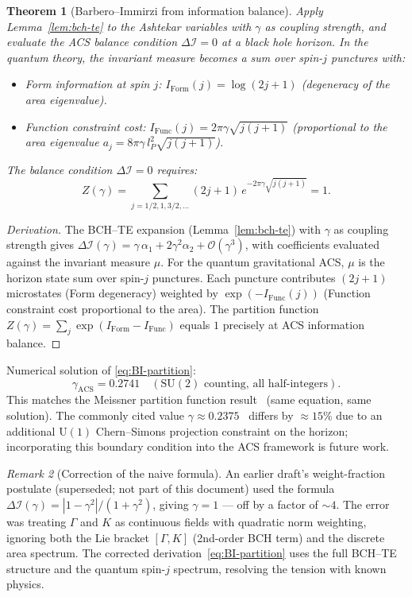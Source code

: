 \documentclass[12pt,a4paper]{article}
\theoremstyle{plain}
\newtheorem{theorem}{Theorem}[section]
\theoremstyle{definition}
\theoremstyle{remark}
\newtheorem{remark}[theorem]{Remark}
\newcommand{\DI}{\Delta\mathcal{I}}
\newcommand{\Order}[1]{\mathcal{O}(#1)}
\begin{document}
\begin{theorem}[Barbero--Immirzi from information balance]\label{thm:BI}
Apply Lemma~\ref{lem:bch-te} to the Ashtekar variables with $\gamma$
as coupling strength, and evaluate the ACS balance condition $\DI = 0$
at a black hole horizon.  In the quantum theory, the invariant measure
becomes a sum over spin-$j$ punctures with:
\begin{itemize}[noitemsep]
  \item Form information at spin $j$: $I_{\mathrm{Form}}(j) = \log(2j+1)$
    (degeneracy of the area eigenvalue).
  \item Function constraint cost: $I_{\mathrm{Func}}(j) = 2\pi\gamma\sqrt{j(j+1)}$
    (proportional to the area eigenvalue $a_j = 8\pi\gamma\,l_P^2\sqrt{j(j+1)}$).
\end{itemize}
The balance condition $\DI = 0$ requires:
\begin{equation}\label{eq:BI-partition}
  Z(\gamma) = \sum_{j=1/2,1,3/2,\ldots} (2j+1)\,
  e^{-2\pi\gamma\sqrt{j(j+1)}} = 1.
\end{equation}
\end{theorem}

\begin{proof}[Derivation]
The BCH--TE expansion (Lemma~\ref{lem:bch-te}) with $\gamma$ as
coupling strength gives $\DI(\gamma) = \gamma\,\alpha_1 + 2\gamma^2\alpha_2 + \Order{\gamma^3}$,
with coefficients evaluated against the invariant measure $\mu$.
For the quantum gravitational ACS, $\mu$ is the horizon state sum
over spin-$j$ punctures.  Each puncture contributes $(2j+1)$ microstates
(Form degeneracy) weighted by $\exp(-I_{\mathrm{Func}}(j))$ (Function
constraint cost proportional to the area).  The partition function
$Z(\gamma) = \sum_j \exp(I_{\mathrm{Form}} - I_{\mathrm{Func}})$
equals $1$ precisely at ACS information balance.
\end{proof}

\noindent Numerical solution of \eqref{eq:BI-partition}:
\[
  \gamma_{\mathrm{ACS}} = 0.2741 \quad (\mathrm{SU}(2)\text{ counting, all half-integers}).
\]
This matches the Meissner partition function result~\cite{Meissner2004}
(same equation, same solution).  The commonly cited value
$\gamma \approx 0.2375$~\cite{Domagala2004} differs by $\approx 15\%$
due to an additional $\mathrm{U}(1)$ Chern--Simons projection constraint
on the horizon; incorporating this boundary condition into the ACS
framework is future work.

\begin{remark}[Correction of the naive formula]
An earlier draft's weight-fraction postulate (superseded; not part of this document) used the formula
$\DI(\gamma) = |1-\gamma^2|/(1+\gamma^2)$, giving $\gamma = 1$ --- off by
a factor of $\sim\!4$.  The error was treating $\Gamma$ and $K$ as continuous
fields with quadratic norm weighting, ignoring both the Lie bracket $[\Gamma, K]$
(2nd-order BCH term) and the discrete area spectrum.
The corrected derivation~\eqref{eq:BI-partition} uses the full BCH--TE
structure and the quantum spin-$j$ spectrum, resolving the tension with
known physics.
\end{remark}
\end{document}
